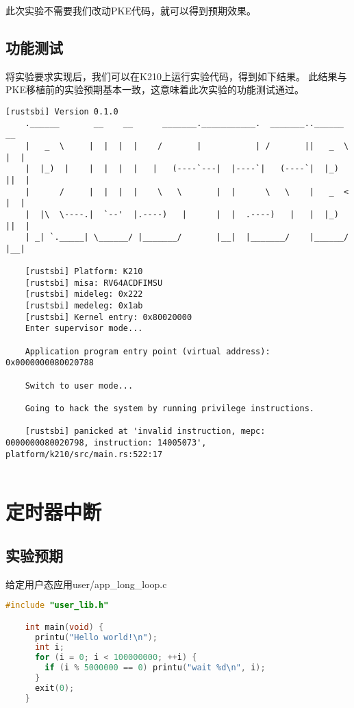 此次实验不需要我们改动PKE代码，就可以得到预期效果。

\subsection{功能测试}

将实验要求实现后，我们可以在K210上运行实验代码，得到如下结果。
此结果与PKE移植前的实验预期基本一致，这意味着此次实验的功能测试通过。

\begin{lstlisting}[caption={lab2实验结果（移植K210后）}, label={lst:app_illegal_instruction_result}]
    [rustsbi] Version 0.1.0
    .______       __    __      _______.___________.  _______..______   __
    |   _  \     |  |  |  |    /       |           | /       ||   _  \ |  |
    |  |_)  |    |  |  |  |   |   (----`---|  |----`|   (----`|  |_)  ||  |
    |      /     |  |  |  |    \   \       |  |      \   \    |   _  < |  |
    |  |\  \----.|  `--'  |.----)   |      |  |  .----)   |   |  |_)  ||  |
    | _| `._____| \______/ |_______/       |__|  |_______/    |______/ |__|
    
    [rustsbi] Platform: K210
    [rustsbi] misa: RV64ACDFIMSU
    [rustsbi] mideleg: 0x222
    [rustsbi] medeleg: 0x1ab
    [rustsbi] Kernel entry: 0x80020000
    Enter supervisor mode...
    
    Application program entry point (virtual address): 0x0000000080020788
    
    Switch to user mode...
    
    Going to hack the system by running privilege instructions.
    
    [rustsbi] panicked at 'invalid instruction, mepc: 0000000080020798, instruction: 14005073', platform/k210/src/main.rs:522:17
        
\end{lstlisting}

\section{定时器中断}

\subsection{实验预期}

给定用户态应用user/app\_long\_loop.c

\begin{lstlisting}[caption={用户态应用app\_long\_loop.c}, label={lst:app_long_loop}, language=C]
    #include "user_lib.h"

    int main(void) {
      printu("Hello world!\n");
      int i;
      for (i = 0; i < 100000000; ++i) {
        if (i % 5000000 == 0) printu("wait %d\n", i);
      }
      exit(0);
    }
\end{lstlisting}

